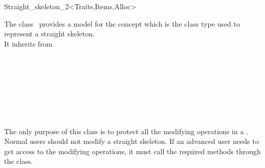 

\begin{ccRefClass}{Straight_skeleton_2<Traits,Items,Alloc>}


\ccDefinition

The class \ccRefName\ provides a model for the
 concept which is the class
type used to represent a straight skeleton.\\
It inherits from 


\ccIsModel
{}\\
\\
\\
\\

\ccSeeAlso
{}\\
\\
\\

The only purpose of this class is to protect all the modifying operations in a . Normal users should not modify a straight skeleton. If an advanced user needs to get access to the modifying operations, it must call the required methods through the  class.

\end{ccRefClass}


